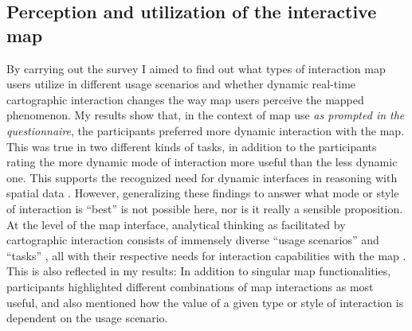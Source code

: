 




\subsection{Perception and utilization of the interactive map}

By carrying out the survey I aimed to find out what types of interaction
map users utilize in different usage scenarios
and whether dynamic real-time cartographic interaction changes the way
map users perceive the mapped phenomenon.
My results show that, in the context of map use \textit{as prompted in the questionnaire},
the participants preferred more dynamic interaction with the map.
This was true in two different kinds of tasks,
in addition to the participants rating the more dynamic mode of interaction
more useful than the less dynamic one.
This supports the recognized need for dynamic interfaces in reasoning with
spatial data \parencite{eds2008, but2018}.
However, generalizing these findings to answer what mode or style of interaction is
\enquote{best} is not possible here,
nor is it really a sensible proposition.
At the level of the map interface, analytical thinking as facilitated by cartographic interaction
consists of immensely diverse \enquote{usage scenarios} and \enquote{tasks}
\parencite{rob2017b, and2010},
all with their respective needs for interaction capabilities with the map
\parencite{rot2013a, rot2015}.
This is also reflected in my results:
In addition to singular map functionalities,
participants highlighted different combinations of map interactions as most useful,
and also mentioned how the value of a given type or style of interaction is
dependent on the usage scenario.  %

